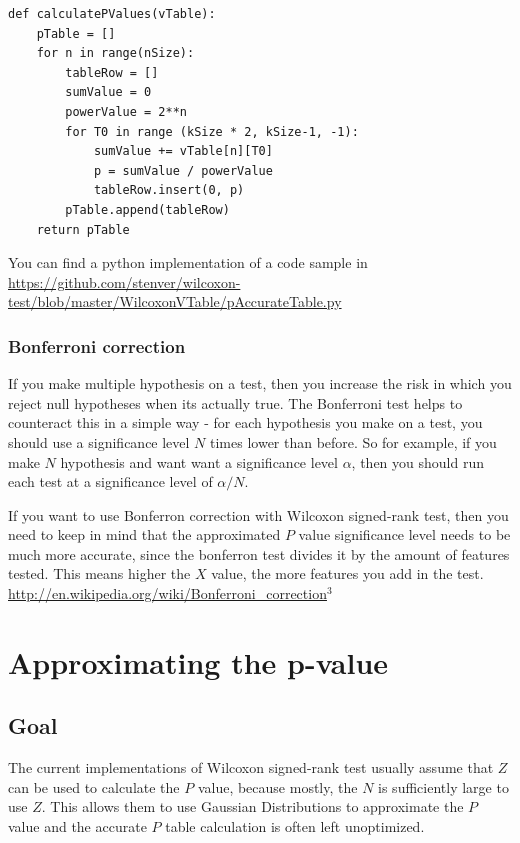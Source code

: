 \documentclass[12pt]{article}
\begin{document}
\begin{verbatim}
def calculatePValues(vTable):
    pTable = []
    for n in range(nSize):
        tableRow = []
        sumValue = 0
        powerValue = 2**n
        for T0 in range (kSize * 2, kSize-1, -1):
            sumValue += vTable[n][T0]
            p = sumValue / powerValue
            tableRow.insert(0, p)
        pTable.append(tableRow)
    return pTable

\end{verbatim}

You can find a python implementation of a code sample in
\url{https://github.com/stenver/wilcoxon-test/blob/master/WilcoxonVTable/pAccurateTable.py}

\subsubsection{Bonferroni correction}

If you make multiple hypothesis on a test, then you increase the risk in which you reject null hypotheses when its actually true. The Bonferroni test helps to counteract this in a simple way - for each hypothesis you make on a test, you should use a significance level $N$ times lower than before. So for example, if you make $N$ hypothesis and want want a significance level $α$,  then you should run each test at a significance level of $α/N$.

If you want to use Bonferron correction with Wilcoxon signed-rank test, then you need to keep in mind that the approximated $P$ value significance level needs to be much more accurate, since the bonferron test divides it by the amount of features tested. This means higher the $X$ value, the more features you add in the test. \url{http://en.wikipedia.org/wiki/Bonferroni_correction}$^3$

\newpage

\section{Approximating the p-value}

\subsection{Goal}
The current implementations of Wilcoxon signed-rank test usually assume that $Z$ can be used to calculate the $P$ value, because mostly, the $N$ is sufficiently large to use $Z$.
This allows them to use Gaussian Distributions to approximate the $P$ value and the accurate $P$ table calculation is often left unoptimized.
\end{document}

